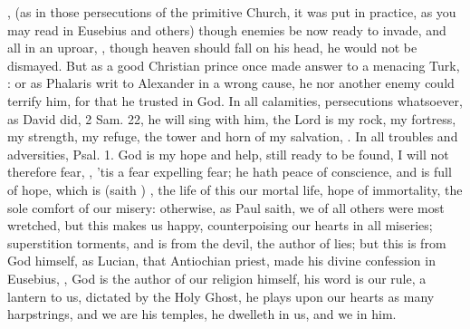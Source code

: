 {, (as in those persecutions of the primitive
Church, it was put in practice, as you may read in Eusebius and others)
though enemies be now ready to invade, and all in an uproar, , though heaven should
fall on his head, he would not be dismayed. But as a good Christian
prince once made answer to a menacing Turk, : or as  Phalaris writ
to Alexander in a wrong cause, he nor another enemy could terrify
him, for that he trusted in God.  In
all calamities, persecutions whatsoever, as David did, 2 Sam.  22,
he will sing with him, the Lord is my rock, my fortress, my strength,
my refuge, the tower and horn of my salvation, \etc{}. In all troubles and
adversities, Psal.  1. God is my hope and help, still ready to be
found, I will not therefore fear, \etc{}, 'tis a fear expelling fear; he
hath peace of conscience, and is full of hope, which is (saith
\Austin{}) , the life of this our mortal life,
hope of immortality, the sole comfort of our misery: otherwise, as Paul
saith, we of all others were most wretched, but this makes us happy,
counterpoising our hearts in all miseries; superstition torments, and
is from the devil, the author of lies; but this is from God himself, as
Lucian, that Antiochian priest, made his divine confession in
Eusebius, , God is the author of our
religion himself, his word is our rule, a lantern to us, dictated by
the Holy Ghost, he plays upon our hearts as many harpstrings, and we
are his temples, he dwelleth in us, and we in him.

}
